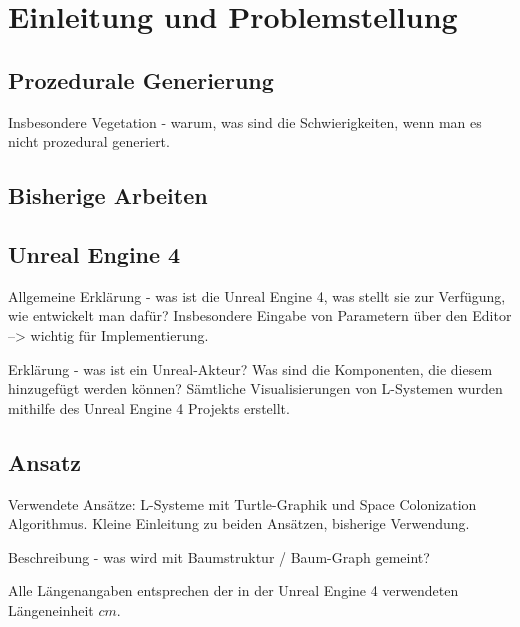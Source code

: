 \chapter{Einleitung und Problemstellung}

\section{Prozedurale Generierung}

Insbesondere Vegetation - warum, was sind die Schwierigkeiten, wenn man es nicht prozedural generiert.

\section{Bisherige Arbeiten}

\section{Unreal Engine 4}

Allgemeine Erklärung - was ist die Unreal Engine 4, was stellt sie zur Verfügung, wie entwickelt man dafür? Insbesondere Eingabe von Parametern über den Editor --> wichtig für Implementierung.

Erklärung - was ist ein Unreal-Akteur? Was sind die Komponenten, die diesem hinzugefügt werden können?
Sämtliche Visualisierungen von L-Systemen wurden mithilfe des Unreal Engine 4 Projekts erstellt.

\section{Ansatz}
Verwendete Ansätze: L-Systeme mit Turtle-Graphik und Space Colonization Algorithmus. Kleine Einleitung zu beiden Ansätzen, bisherige Verwendung.

Beschreibung - was wird mit Baumstruktur / Baum-Graph gemeint?

Alle Längenangaben entsprechen der in der Unreal Engine 4 verwendeten Längeneinheit $cm$.